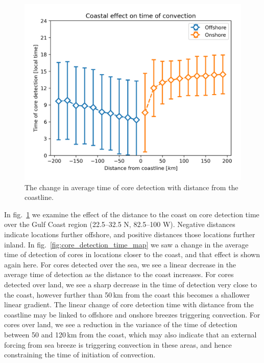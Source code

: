 \begin{figure}[tp]
    \centering
    \includegraphics[width=\textwidth]{figures/chapter2_14.png}
    \caption[
    The change in average time of core detection with distance from the coastline
    ]{
    The change in average time of core detection with distance from the coastline.
    }
    \label{fig:core_coast_effect}
\end{figure}

In fig.~\ref{fig:core_coast_effect} we examine the effect of the distance to the coast on core detection time over the Gulf Coast region (22.5--32.5\,\textdegree\,N, 82.5--100\,\textdegree\,W).
Negative distances indicate locations further offshore, and positive distances those locations further inland.
In fig.~\ref{fig:core_detection_time_map} we saw a change in the average time of detection of cores in locations closer to the coast, and that effect is shown again here.
For cores detected over the sea, we see a linear decrease in the average time of detection as the distance to the coast increases.
For cores detected over land, we see a sharp decrease in the time of detection very close to the coast, however further than 50\,\unit{km} from the coast this becomes a shallower linear gradient.
The linear change of core detection time with distance from the coastline may be linked to offshore and onshore breezes triggering convection.
For cores over land, we see a reduction in the variance of the time of detection between 50 and 120\,\unit{km} from the coast, which may also indicate that an external forcing from sea breeze is triggering convection in these areas, and hence constraining the time of initiation of convection.

